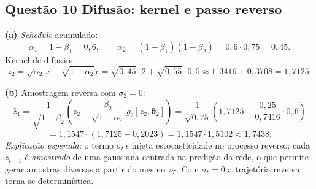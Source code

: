 \documentclass[11pt,a4paper]{article}
\newcommand{\thetav}{\boldsymbol{\theta}}
\begin{document}
\subsection*{Questão 10 \textemdash{} Difusão: kernel e passo reverso}

\textbf{(a)} \textit{Schedule} acumulado:
\[
\alpha_1 = 1 - \beta_1 = 0{,}6, \qquad \alpha_2 = (1 - \beta_1)(1 - \beta_2) = 0{,}6 \cdot 0{,}75 = 0{,}45.
\]
Kernel de difusão:
\[
z_2 = \sqrt{\alpha_2}\,x + \sqrt{1 - \alpha_2}\,\epsilon = \sqrt{0{,}45} \cdot 2 + \sqrt{0{,}55} \cdot 0{,}5 \approx 1{,}3416 + 0{,}3708 = 1{,}7125.
\]

\textbf{(b)} Amostragem reversa com $\sigma_2 = 0$:
\[
\hat{z}_1 = \frac{1}{\sqrt{1 - \beta_2}}\left(z_2 - \frac{\beta_2}{\sqrt{1 - \alpha_2}}\,g_2[z_2, \thetav_2]\right)
= \frac{1}{\sqrt{0{,}75}}\left(1{,}7125 - \frac{0{,}25}{0{,}7416} \cdot 0{,}6\right)
\]
\[
= 1{,}1547 \cdot (1{,}7125 - 0{,}2023) = 1{,}1547 \cdot 1{,}5102 \approx 1{,}7438.
\]
\textit{Explicação esperada:} o termo $\sigma_t\,\epsilon$ injeta estocasticidade no processo reverso: cada $z_{t-1}$ é \emph{amostrado} de uma gaussiana centrada na predição da rede, o que permite gerar amostras diversas a partir do mesmo $z_T$. Com $\sigma_t = 0$ a trajetória reversa torna-se determinística.

\color{black}
\end{document}
